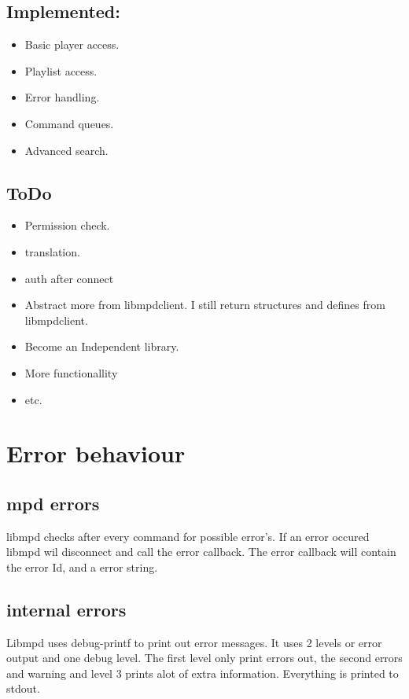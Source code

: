 \documentclass[a4paper,11pt]{article}
\begin{document}
\subsection{ Implemented:}

\begin{itemize}
  \item Basic player access.
  
  \item Playlist access.
  
  \item Error handling.
  
  \item Command queues.
  
  \item Advanced search.
\end{itemize}

\subsection{ToDo}
\begin{itemize}
  \item Permission check.
  
  \item translation.
  
  \item auth after connect
  
  \item Abstract more from libmpdclient. I still return structures and defines
  from libmpdclient.
  
  \item Become an Independent  library.
  
  \item More functionallity
  
  \item etc.
\end{itemize}


\section{Error behaviour}
\subsection{mpd errors}
libmpd checks after every command for possible error's. If an error occured
libmpd wil disconnect and call the error callback. The error callback will
contain the error Id, and a error string.
\subsection {internal errors}
Libmpd uses debug-printf to print out error messages. It uses 2 levels or error output and one debug level.
The first level only print errors out, the second errors and warning and level 3 prints alot of extra information.
Everything is printed to stdout.
\end{document}
